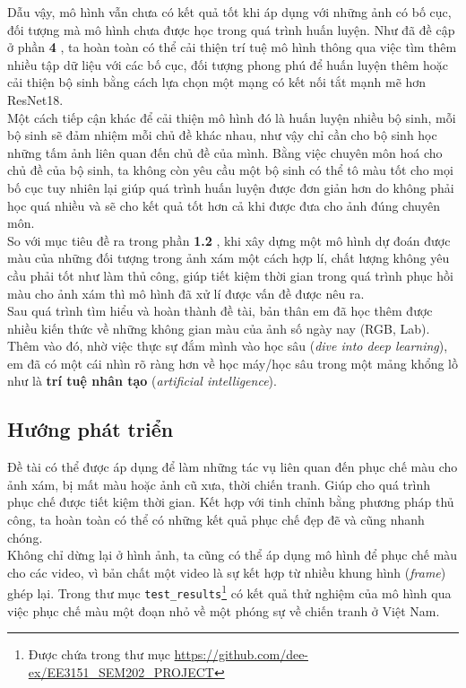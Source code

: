 \documentclass[a4paper]{article}
\begin{document}
\noindent
Dẫu vậy, mô hình vẫn chưa có kết quả tốt khi áp dụng với những ảnh có bố cục, đối tượng mà mô hình chưa được học trong quá trình huấn luyện. Như đã đề cập ở phần \textbf{4 }, ta hoàn toàn có thể cải thiện trí tuệ mô hình thông qua việc tìm thêm nhiều tập dữ liệu với các bố cục, đối tượng phong phú để huấn luyện thêm hoặc cải thiện bộ sinh bằng cách lựa chọn một mạng có kết nối tắt mạnh mẽ hơn ResNet18.\\
Một cách tiếp cận khác để cải thiện mô hình đó là huấn luyện nhiều bộ sinh, mỗi bộ sinh sẽ đảm nhiệm mỗi chủ đề khác nhau, như vậy chỉ cần cho bộ sinh học những tấm ảnh liên quan đến chủ đề của mình. Bằng việc chuyên môn hoá cho chủ đề của bộ sinh, ta không còn yêu cầu một bộ sinh có thể tô màu tốt cho mọi bố cục tuy nhiên lại giúp quá trình huấn luyện được đơn giản hơn do không phải học quá nhiều và sẽ cho kết quả tốt hơn cả khi được đưa cho ảnh đúng chuyên môn.\\

\noindent
So với mục tiêu đề ra trong phần \textbf{1.2 }, khi xây dựng một mô hình dự đoán được màu của những đối tượng trong ảnh xám một cách hợp lí, chất lượng không yêu cầu phải tốt như làm thủ công, giúp tiết kiệm thời gian trong quá trình phục hồi màu cho ảnh xám thì mô hình đã xử lí được vấn đề được nêu ra.\\

\noindent
Sau quá trình tìm hiểu và hoàn thành đề tài, bản thân em đã học thêm được nhiều kiến thức về những không gian màu của ảnh số ngày nay (RGB, Lab). Thêm vào đó, nhờ việc thực sự đắm mình vào học sâu (\textit{dive into deep learning}), em đã có một cái nhìn rõ ràng hơn về học máy/học sâu trong một mảng khổng lồ như là \textbf{trí tuệ nhân tạo} (\textit{artificial intelligence}).

\subsection{Hướng phát triển}
Đề tài có thể được áp dụng để làm những tác vụ liên quan đến phục chế màu cho ảnh xám, bị mất màu hoặc ảnh cũ xưa, thời chiến tranh. Giúp cho quá trình phục chế được tiết kiệm thời gian. Kết hợp với tinh chỉnh bằng phương pháp thủ công, ta hoàn toàn có thể có những kết quả phục chế đẹp đẽ và cũng nhanh chóng.\\

\noindent
Không chỉ dừng lại ở hình ảnh, ta cũng có thể áp dụng mô hình để phục chế màu cho các video, vì bản chất một video là sự kết hợp từ nhiều khung hình (\textit{frame}) ghép lại. Trong thư mục \texttt{test\_results}\footnote{Được chứa trong thư mục \href{https://github.com/dee-ex/EE3151\_SEM202\_PROJECT}{https://github.com/dee-ex/EE3151\_SEM202\_PROJECT}} có kết quả thử nghiệm của mô hình qua việc phục chế màu một đoạn nhỏ về một phóng sự về chiến tranh ở Việt Nam.
\end{document}
